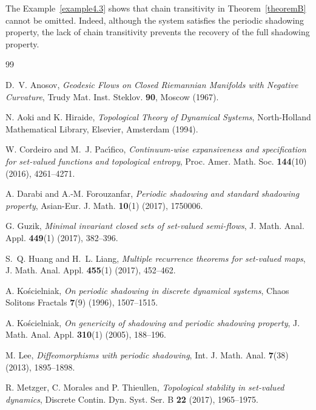 \documentclass{amsart}
\theoremstyle{definition}
\begin{document}
The Example~\ref{example4.3} shows that chain transitivity in Theorem~\ref{theoremB}
cannot be omitted. Indeed, although the system satisfies the periodic
shadowing property, the lack of chain transitivity prevents the
recovery of the full shadowing property.



\begin{thebibliography}{99}

D.~V. Anosov,
\emph{Geodesic Flows on Closed Riemannian Manifolds with Negative Curvature},
Trudy Mat. Inst. Steklov. \textbf{90}, Moscow (1967).

N. Aoki and K. Hiraide,
\emph{Topological Theory of Dynamical Systems},
North-Holland Mathematical Library, Elsevier, Amsterdam (1994).



W. Cordeiro and M.~J. Pac{\'\i}fico,
\emph{Continuum-wise expansiveness and specification for set-valued functions and topological entropy},
Proc. Amer. Math. Soc.
\textbf{144}(10) (2016), 4261--4271.

A. Darabi and A.-M. Forouzanfar,
\emph{Periodic shadowing and standard shadowing property},
Asian-Eur. J. Math.
\textbf{10}(1) (2017), 1750006.

G. Guzik,
\emph{Minimal invariant closed sets of set-valued semi-flows},
J. Math. Anal. Appl.
\textbf{449}(1) (2017), 382--396.

S.~Q. Huang and H.~L. Liang,
\emph{Multiple recurrence theorems for set-valued maps},
J. Math. Anal. Appl.
\textbf{455}(1) (2017), 452--462.



A. Ko\'scielniak,
\emph{On periodic shadowing in discrete dynamical systems},
Chaos Solitons Fractals
\textbf{7}(9) (1996), 1507--1515.

A. Ko\'scielniak,
\emph{On genericity of shadowing and periodic shadowing property},
J. Math. Anal. Appl.
\textbf{310}(1) (2005), 188--196.

M. Lee,
\emph{Diffeomorphisms with periodic shadowing},
Int. J. Math. Anal.
\textbf{7}(38) (2013), 1895--1898.

R. Metzger, C. Morales and P. Thieullen,
\emph{Topological stability in set-valued dynamics},
Discrete Contin. Dyn. Syst. Ser. B
\textbf{22} (2017), 1965--1975.


\end{thebibliography}
\end{document}

